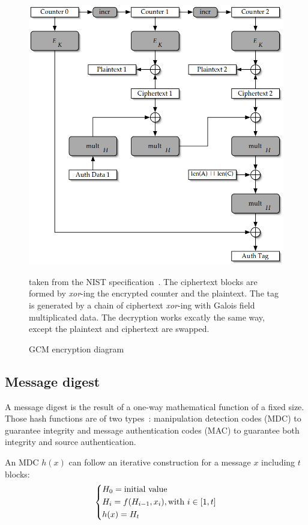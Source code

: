 \begin{figure}
\includegraphics[width=\textwidth]{nist-gcm-encrypt}
\caption{GCM encryption diagram}{taken from the NIST specification~\cite{mcgrew2005}. The ciphertext blocks are formed by \textit{xor}-ing the encrypted counter and the plaintext. The tag is generated by a chain of ciphertext \textit{xor}-ing with Galois field multiplicated data. The decryption works excatly the same way, except the plaintext and ciphertext are swapped.}
\label{fig:gcm-encrypt}
\end{figure}








\subsection{Message digest}
A message digest is the result of a one-way mathematical function of a fixed size.
Those hash functions are of two types~\cite{infof405}: manipulation detection codes (MDC) to guarantee integrity and message authentication codes (MAC) to guarantee both integrity and source authentication.


An MDC $h(x)$ can follow an iterative construction for a message $x$ including $t$ blocks:
\[
\begin{dcases}
	H_0 = \mbox{initial value}\\
	H_i = f(H_{i-1}, x_i), \mbox{with } i \in [1,t]\\
	h(x) = H_t\\
\end{dcases}
\]

